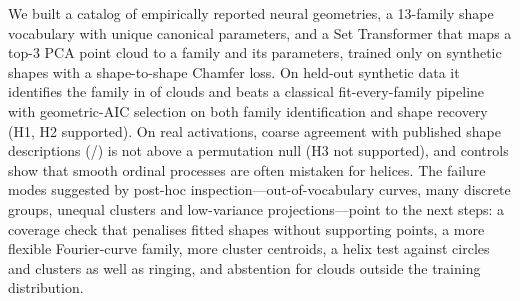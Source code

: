 We built a catalog of empirically reported neural geometries, a 13-family shape vocabulary with unique canonical parameters, and a Set Transformer that maps a top-3 PCA point cloud to a family and its parameters, trained only on synthetic shapes with a shape-to-shape Chamfer loss. On held-out synthetic data it identifies the family in \accMethod{} of clouds and beats a classical fit-every-family pipeline with geometric-AIC selection on both family identification and shape recovery (H1, H2 supported). On real activations, coarse agreement with published shape descriptions (\hthreeAgree{}/\hthreeN{}) is not above a permutation null (H3 not supported), and controls show that smooth ordinal processes are often mistaken for helices. The failure modes suggested by post-hoc inspection---out-of-vocabulary curves, many discrete groups, unequal clusters and low-variance projections---point to the next steps: a coverage check that penalises fitted shapes without supporting points, a more flexible Fourier-curve family, more cluster centroids, a helix test against circles and clusters as well as ringing, and abstention for clouds outside the training distribution.
